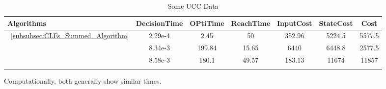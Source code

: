   \bgroup
 \begin{xltabular}{\textwidth}{|l|cccccc|}
   \toprule
   Algorithms   & DecisionTime & OPtiTime & ReachTime  & InputCost   & StateCost & Cost           \\
   \midrule
    ~\ref{subsubsec:CLFs_Summed_Algorithm}        & 2.29e-4 & 2.45 & 50 & 352.96 & 5224.5 & 5577.5 \\
                                                    & 8.34e-3 & 199.84  & 15.65  & 6440  & 6448.8 & 2577.5 \\
                                                    & 8.58e-3 & 180.1 & 49.57 & 183.13  & 11674  & 11857 \\
    \midrule
    \caption{Some UCC Data}
    \label{tab:Some_mpc_UCC_Data}\\
   \end{xltabular}
 \egroup


 Computationally, both  generally show similar times.











